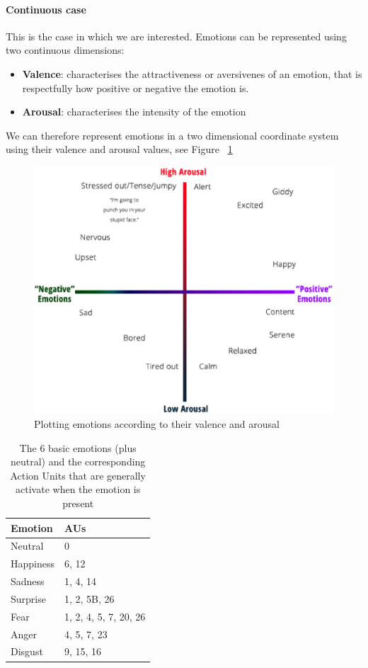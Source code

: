\documentclass[12pt,twoside]{article}
\begin{document}
\paragraph{Continuous case}
This is the case in which we are interested. Emotions can be represented using two continuous dimensions:

\begin{itemize}
\item \textbf{Valence}: characterises the attractiveness or aversivenes of an emotion, that is respectfully how positive or negative the emotion is.
\item \textbf{Arousal}: characterises the intensity of the emotion
\end{itemize}

We can therefore represent emotions in a two dimensional coordinate system using their valence and arousal values, see Figure ~\ref{fig:arval} 

\begin{figure}[h]
\centering
\includegraphics[scale=0.5]{./figures/valence_arousal_plot.eps}
\caption{Plotting emotions according to their valence and arousal}
\label{fig:arval}
\end{figure}

\begin{table}[h]
\centering
\begin{tabular}{|l|l|}
 \hline
 Emotion & AUs\\
 \hline
 Neutral   & 0                     \\
 Happiness & 6, 12                 \\
 Sadness   & 1, 4, 14              \\
 Surprise  & 1, 2, 5B, 26          \\
 Fear      & 1, 2, 4, 5, 7, 20, 26 \\
 Anger     & 4, 5, 7, 23           \\
 Disgust   & 9, 15, 16             \\
 \hline
\end{tabular}
\caption{The 6 basic emotions (plus neutral) and the corresponding Action Units that are generally activate when the emotion is present}
\label{tab:emo-au}
\end{table}
\end{document}
